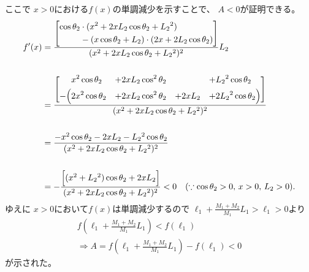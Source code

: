 \documentclass[a4paper,11pt]{jsarticle}
\begin{document}
ここで
$x>0$における$f(x)$の単調減少を示すことで、
$A<0$が証明できる。
\begin{align*}
  f' (x)
  &= \frac{
    \Biggl[
    \begin{aligned}
      \cos\theta_2 &\cdot (x^2 + 2xL_2\cos\theta_2 + L_2{}^2)
      \\
      &- (x\cos\theta_2 + L_2)\cdot (2x + 2L_2\cos\theta_2)
    \end{aligned}
    \Biggr]
  }{
    (x^2 + 2xL_2\cos\theta_2 + L_2{}^2)^2
  }
  L_2
  \\
  \\
  &= \frac{
    \Biggl[
    \begin{aligned}
      &x^2\cos\theta_2 
      &+& 2xL_2\cos^2\theta_2 
      &&
      &+& L_2{}^2\cos\theta_2
      \\
      -\Big(
        &2x^2\cos\theta_2 
        &+& 2xL_2\cos^2\theta_2
        &+& 2xL_2
        &+& 2L_2{}^2\cos\theta_2
      \Big)
    \end{aligned}
    \Biggr]
  }{
    (x^2 + 2xL_2\cos\theta_2 + L_2{}^2)^2
  }
  \\
  \\
  &=\frac{
    -x^2\cos\theta_2 - 2xL_2 - L_2{}^2\cos\theta_2
  }{
    (x^2 + 2xL_2\cos\theta_2 + L_2{}^2)^2
  }
  \\
  \\
  &= -\frac{
    \Bigl[(x^2 + L_2{}^2)\cos\theta_2 + 2xL_2\Bigr]
  }{
    (x^2 + 2xL_2\cos\theta_2 + L_2{}^2)^2
  }
  < 0 \quad (\because \cos\theta_2 > 0, \, x > 0, \, L_2 > 0).
\end{align*}
ゆえに
$x>0$において$f(x)$は単調減少するので
$\ell_1 + \frac{M_1+M_2}{M_1}L_1 > \ell_1 > 0$より
\begin{gather*}
  f\left(\ell_1 + \frac{M_1+M_2}{M_1}L_1\right) < f(\ell_1)
  \\
  \Rightarrow
  A = f\left(\ell_1 + \frac{M_1+M_2}{M_1}L_1\right) - f(\ell_1) < 0
\end{gather*}
が示された。
\end{document}
